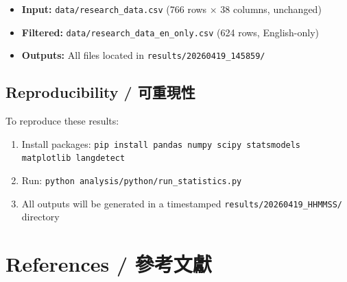 \documentclass[12pt,a4paper]{article}
\begin{document}
\begin{itemize}
    \item \textbf{Input:} \texttt{data/research\_data.csv} (766 rows × 38 columns, unchanged)
    \item \textbf{Filtered:} \texttt{data/research\_data\_en\_only.csv} (624 rows, English-only)
    \item \textbf{Outputs:} All files located in \texttt{results/20260419\_145859/}
\end{itemize}

\subsection{Reproducibility / 可重現性}

To reproduce these results:
\begin{enumerate}
    \item Install packages: \texttt{pip install pandas numpy scipy statsmodels matplotlib langdetect}
    \item Run: \texttt{python analysis/python/run\_statistics.py}
    \item All outputs will be generated in a timestamped \texttt{results/20260419\_HHMMSS/} directory
\end{enumerate}

\section{References / 參考文獻}
\end{document}
